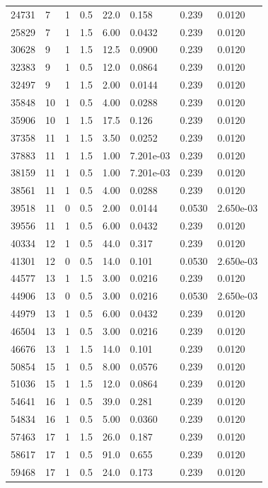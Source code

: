 \documentclass[preview]{standalone}
\begin{document}
{{\begin{tabular}{L{1.2cm}C{1.2cm} C{0.3cm}C{0.5cm} C{1.4cm}C{1.4cm} C{1.4cm}C{1.4cm}}
  24731  &     7  & 1     & 0.5 &  22.0  & 0.158  & 0.239 &  0.0120   \\ 
  25829  &     7  & 1     & 1.5 &  6.00  & 0.0432  & 0.239 &  0.0120   \\ 
  30628  &     9  & 1     & 1.5 &  12.5  & 0.0900  & 0.239 &  0.0120   \\ 
  32383  &     9  & 1     & 0.5 &  12.0  & 0.0864  & 0.239 &  0.0120   \\ 
  32497  &     9  & 1     & 1.5 &  2.00  & 0.0144  & 0.239 &  0.0120   \\ 
  35848  &    10  & 1     & 0.5 &  4.00  & 0.0288  & 0.239 &  0.0120   \\ 
  35906  &    10  & 1     & 1.5 &  17.5  & 0.126  & 0.239 &  0.0120   \\ 
  37358  &    11  & 1     & 1.5 &  3.50  & 0.0252  & 0.239 &  0.0120   \\ 
  37883  &    11  & 1     & 1.5 &  1.00  & 7.201e-03  & 0.239 &  0.0120   \\ 
  38159  &    11  & 1     & 0.5 &  1.00  & 7.201e-03  & 0.239 &  0.0120   \\ 
  38561  &    11  & 1     & 0.5 &  4.00  & 0.0288  & 0.239 &  0.0120   \\ 
  39518  &    11  & 0     & 0.5 &  2.00  & 0.0144  & 0.0530 &  2.650e-03   \\ 
  39556  &    11  & 1     & 0.5 &  6.00  & 0.0432  & 0.239 &  0.0120   \\ 
  40334  &    12  & 1     & 0.5 &  44.0  & 0.317  & 0.239 &  0.0120   \\ 
  41301  &    12  & 0     & 0.5 &  14.0  & 0.101  & 0.0530 &  2.650e-03   \\ 
  44577  &    13  & 1     & 1.5 &  3.00  & 0.0216  & 0.239 &  0.0120   \\ 
  44906  &    13  & 0     & 0.5 &  3.00  & 0.0216  & 0.0530 &  2.650e-03   \\ 
  44979  &    13  & 1     & 0.5 &  6.00  & 0.0432  & 0.239 &  0.0120   \\ 
  46504  &    13  & 1     & 0.5 &  3.00  & 0.0216  & 0.239 &  0.0120   \\ 
  46676  &    13  & 1     & 1.5 &  14.0  & 0.101  & 0.239 &  0.0120   \\ 
  50854  &    15  & 1     & 0.5 &  8.00  & 0.0576  & 0.239 &  0.0120   \\ 
  51036  &    15  & 1     & 1.5 &  12.0  & 0.0864  & 0.239 &  0.0120   \\ 
  54641  &    16  & 1     & 0.5 &  39.0  & 0.281  & 0.239 &  0.0120   \\ 
  54834  &    16  & 1     & 0.5 &  5.00  & 0.0360  & 0.239 &  0.0120   \\ 
  57463  &    17  & 1     & 1.5 &  26.0  & 0.187  & 0.239 &  0.0120   \\ 
  58617  &    17  & 1     & 0.5 &  91.0  & 0.655  & 0.239 &  0.0120   \\ 
  59468  &    17  & 1     & 0.5 &  24.0  & 0.173  & 0.239 &  0.0120   \\ 
\hline 
\end{tabular} 

}}
\end{document}
